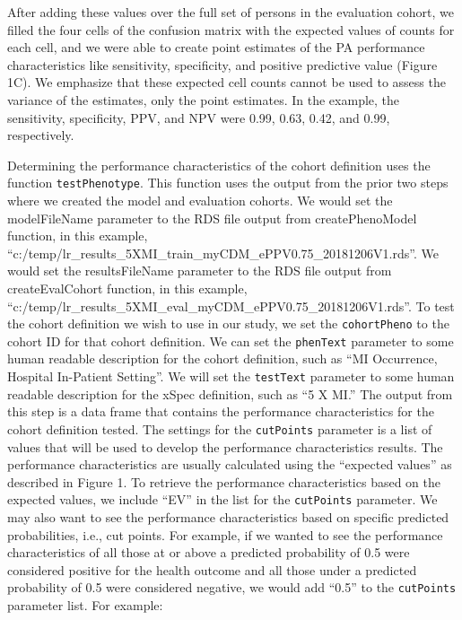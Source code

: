 \documentclass[11pt]{book}
\theoremstyle{definition}
\theoremstyle{definition}
\theoremstyle{definition}
\theoremstyle{remark}
\begin{document}
After adding these values over the full set of persons in the evaluation
cohort, we filled the four cells of the confusion matrix with the
expected values of counts for each cell, and we were able to create
point estimates of the PA performance characteristics like sensitivity,
specificity, and positive predictive value (Figure 1C). We emphasize
that these expected cell counts cannot be used to assess the variance of
the estimates, only the point estimates. In the example, the
sensitivity, specificity, PPV, and NPV were 0.99, 0.63, 0.42, and 0.99,
respectively.

Determining the performance characteristics of the cohort definition
uses the function \texttt{testPhenotype}. This function uses the output
from the prior two steps where we created the model and evaluation
cohorts. We would set the modelFileName parameter to the RDS file output
from createPhenoModel function, in this example,
``c:/temp/lr\_results\_5XMI\_train\_myCDM\_ePPV0.75\_20181206V1.rds''.
We would set the resultsFileName parameter to the RDS file output from
createEvalCohort function, in this example,
``c:/temp/lr\_results\_5XMI\_eval\_myCDM\_ePPV0.75\_20181206V1.rds''. To
test the cohort definition we wish to use in our study, we set the
\texttt{cohortPheno} to the cohort ID for that cohort definition. We can
set the \texttt{phenText} parameter to some human readable description
for the cohort definition, such as ``MI Occurrence, Hospital In-Patient
Setting''. We will set the \texttt{testText} parameter to some human
readable description for the xSpec definition, such as ``5 X MI.'' The
output from this step is a data frame that contains the performance
characteristics for the cohort definition tested. The settings for the
\texttt{cutPoints} parameter is a list of values that will be used to
develop the performance characteristics results. The performance
characteristics are usually calculated using the ``expected values'' as
described in Figure 1. To retrieve the performance characteristics based
on the expected values, we include ``EV'' in the list for the
\texttt{cutPoints} parameter. We may also want to see the performance
characteristics based on specific predicted probabilities, i.e., cut
points. For example, if we wanted to see the performance characteristics
of all those at or above a predicted probability of 0.5 were considered
positive for the health outcome and all those under a predicted
probability of 0.5 were considered negative, we would add ``0.5'' to the
\texttt{cutPoints} parameter list. For example:
\end{document}
